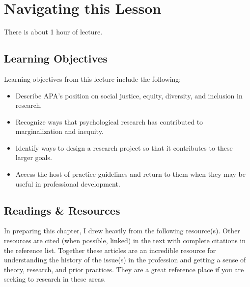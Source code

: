 \documentclass[
  english,
]{book}
\providecommand{\tightlist}{%
  \setlength{\itemsep}{0pt}\setlength{\parskip}{0pt}}
\begin{document}
\hypertarget{navigating-this-lesson-4}{%
\section{Navigating this Lesson}\label{navigating-this-lesson-4}}

There is about 1 hour of lecture.

\hypertarget{learning-objectives-4}{%
\subsection{Learning Objectives}\label{learning-objectives-4}}

Learning objectives from this lecture include the following:

\begin{itemize}
\tightlist
\item
  Describe APA's position on social justice, equity, diversity, and inclusion in research.
\item
  Recognize ways that psychological research has contributed to marginalization and inequity.
\item
  Identify ways to design a research project so that it contributes to these larger goals.
\item
  Access the host of practice guidelines and return to them when they may be useful in professional development.
\end{itemize}

\hypertarget{readings-resources-4}{%
\subsection{Readings \& Resources}\label{readings-resources-4}}

In preparing this chapter, I drew heavily from the following resource(s). Other resources are cited (when possible, linked) in the text with complete citations in the reference list. Together these articles are an incredible resource for understanding the history of the issue(s) in the profession and getting a sense of theory, research, and prior practices. They are a great reference place if you are seeking to research in these areas.
\end{document}
